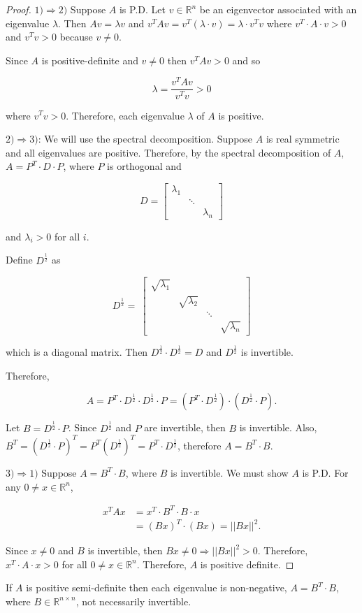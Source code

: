 \documentclass[12pt]{article}
\theoremstyle{definition}
\begin{document}
\begin{proof}
$1) \Rightarrow 2)$ Suppose $A$ is P.D. Let $v \in \mathbb{R}^n$ be an eigenvector
associated with an eigenvalue $\lambda$. Then $A v = \lambda v$ and 
$v^T A v = v^T (\lambda \cdot v) = \lambda \cdot v^T v$ where $v^T \cdot A \cdot v > 0$
and $v^T v > 0$ because $v \neq 0$.

Since $A$ is positive-definite and $v \neq 0$ then $v^T A v > 0$ and so

\[\lambda = \frac{v^T A v} {v^T v} > 0 \]

where $v^T v > 0$. Therefore, each eigenvalue $\lambda$ of $A$ is positive.

$2) \Rightarrow 3)$: We will use the spectral decomposition. Suppose $A$ is real
symmetric and all eigenvalues are positive. Therefore, by the spectral decomposition
of $A$, $A = P^T \cdot D \cdot P$, where $P$ is orthogonal and

\[ D =
\begin{bmatrix}
\lambda_1 & & \\
& \ddots & \\
& & \lambda_n
\end{bmatrix}
\]

and $\lambda_i > 0$ for all $i$.


Define $D^{\frac{1}{2}}$ as

\[
D^{\frac{1}{2}} =\
\begin{bmatrix}
\sqrt{\lambda_1} & & & \\
& \sqrt{\lambda_2} & & \\
& & \ddots & \\
& & & \sqrt{\lambda_n}
\end{bmatrix}
\]

which is a diagonal matrix. Then $D^{\frac{1}{2}} \cdot D^{\frac{1}{2}} = D$ and
$D^{\frac{1}{2}}$ is invertible.

Therefore, 

\[ A = P^T \cdot D^{\frac{1}{2}} \cdot D^{\frac{1}{2}} \cdot P =
(P^T \cdot D^{\frac{1}{2}}) \cdot (D^{\frac{1}{2}} \cdot P).\]

Let $B = D^{\frac{1}{2}} \cdot P$. Since $D^{\frac{1}{2}}$ and $P$ are invertible, then
$B$ is invertible. Also, $B^T = (D^{\frac{1}{2}} \cdot P)^T = P^T (D^{\frac{1}{2}})^T = P^T \cdot D^{\frac{1}{2}}$,
therefore $A = B^T \cdot B$.

$3) \Rightarrow 1)$ Suppose $A = B^T \cdot B$, where $B$ is invertible. We must show $A$ is P.D. For any
$0 \neq x \in \mathbb{R}^n$,

\begin{align*}
x^T A x &= x^T \cdot B^T \cdot B \cdot x \\
&= (Bx)^T \cdot (Bx) = || B x ||^2.
\end{align*}

Since $x \neq 0$ and $B$ is invertible, then $Bx \neq 0 \Rightarrow || Bx ||^2 > 0$. Therefore,
$x^T \cdot A \cdot x > 0$ for all $0 \neq x \in \mathbb{R}^n$. Therefore, $A$ is positive
definite.
\end{proof}

If $A$ is positive semi-definite then each eigenvalue is non-negative, $A = B^T \cdot B$, where
$B \in \mathbb{R}^{n \times n}$, not necessarily invertible.
\end{document}
